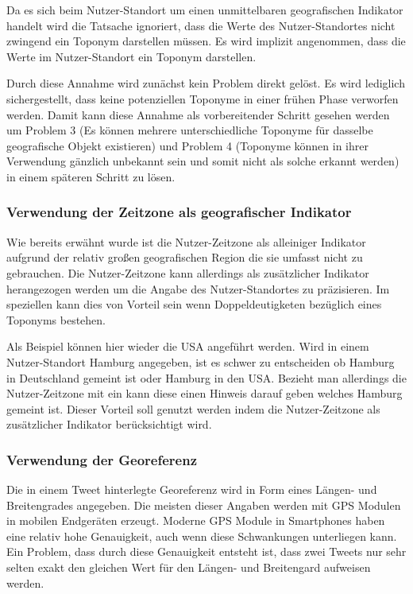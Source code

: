 						Da es sich beim Nutzer-Standort um einen unmittelbaren geografischen Indikator handelt wird die Tatsache ignoriert, dass die Werte des Nutzer-Standortes nicht zwingend ein Toponym darstellen müssen. 
						Es wird implizit angenommen, dass die Werte im Nutzer-Standort ein Toponym darstellen.
						
						
						Durch diese Annahme wird zunächst kein Problem direkt gelöst. 
						Es wird lediglich sichergestellt, dass keine potenziellen Toponyme in einer frühen Phase verworfen werden. 
						Damit kann diese Annahme als vorbereitender Schritt gesehen werden um Problem 3 (Es können mehrere unterschiedliche Toponyme für dasselbe geografische Objekt existieren) und Problem 4 (Toponyme können in ihrer Verwendung gänzlich unbekannt sein und somit nicht als solche erkannt werden) in einem späteren Schritt zu lösen. 

					\subsubsection{Verwendung der Zeitzone als geografischer Indikator}

						Wie bereits erwähnt wurde ist die Nutzer-Zeitzone als alleiniger Indikator aufgrund der relativ großen geografischen Region die sie umfasst nicht zu gebrauchen. 
						Die Nutzer-Zeitzone kann allerdings als zusätzlicher Indikator herangezogen werden um die Angabe des Nutzer-Standortes zu präzisieren.	
						Im speziellen kann dies von Vorteil sein wenn Doppeldeutigketen bezüglich eines Toponyms bestehen. 

						Als Beispiel können hier wieder die USA angeführt werden. 
						Wird in einem Nutzer-Standort Hamburg angegeben, ist es schwer zu entscheiden ob Hamburg in Deutschland gemeint ist oder Hamburg in den USA. 
						Bezieht man allerdings die Nutzer-Zeitzone mit ein kann diese einen Hinweis darauf geben welches Hamburg gemeint ist.
						Dieser Vorteil soll genutzt werden indem die Nutzer-Zeitzone als zusätzlicher Indikator berücksichtigt wird.  

					\subsubsection{Verwendung der Georeferenz}  
						Die in einem Tweet hinterlegte Georeferenz wird in Form eines Längen- und Breitengrades angegeben.
						Die meisten dieser Angaben werden mit GPS Modulen in mobilen Endgeräten erzeugt. 
						Moderne GPS Module in Smartphones haben eine relativ hohe Genauigkeit, auch wenn diese Schwankungen unterliegen kann.
						Ein Problem, dass durch diese Genauigkeit entsteht ist, dass zwei Tweets nur sehr selten exakt den gleichen Wert für den Längen- und Breitengard aufweisen werden.


